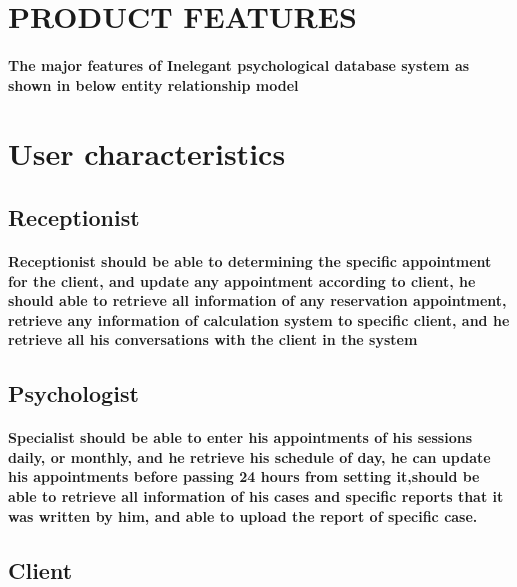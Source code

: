 \documentclass[../Psychological_system_web_application.tex]{subfiles}
\begin{document}
		\section{PRODUCT FEATURES}
			
			\paragraph{  The major features of Inelegant psychological \gls{database} system as shown in below \gls{entity relationship model}}
				
		
		\section{User characteristics}
			\subsection{Receptionist}			
			\paragraph{Receptionist should be able to determining the specific appointment for the client, and update any appointment according to client, he should able to retrieve all information of any reservation appointment, retrieve any information of calculation system to specific client, and he retrieve all his conversations with the client in the system}
			
			\subsection{Psychologist}
			\paragraph{Specialist should be able to enter his appointments of his sessions daily, or monthly, and he retrieve his schedule of day, he can update his appointments before passing 24 hours from setting it,should be able to retrieve all information of his cases and specific reports that it was written by him, and able to upload the report of specific case.}
			
			\subsection{Client}
\end{document}
